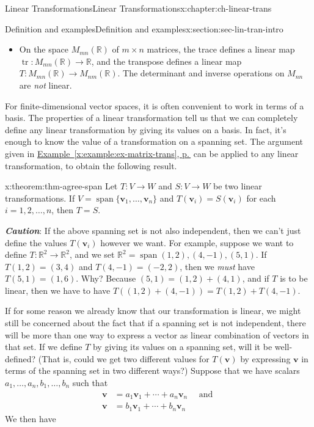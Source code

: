 \documentclass[oneside,10pt,]{book}
\newcommand{\xreffont}{\relax}
\newcommand{\alert}[1]{\textbf{\textit{#1}}}
\numberwithin{equation}{section}
\newcommand{\spn}{\operatorname{span}}
\newcommand{\R}{\mathbb{R}}
\newcommand{\vv}{\mathbf{v}}
\newcommand{\amp}{&}
\begin{document}
\begin{chapterptx}{Linear Transformations}{}{Linear Transformations}{}{}{x:chapter:ch-linear-trans}
\begin{sectionptx}{Definition and examples}{}{Definition and examples}{}{}{x:section:sec-lin-tran-intro}
\begin{itemize}[label=\textbullet]
are both linear.%
\item{}On the space \(M_{mn}(\R)\) of \(m\times n\) matrices, the trace defines a linear map \(\operatorname{tr}:M_{mn}(\R)\to \R\), and the transpose defines a linear map \(T:M_{mn}(\R)\to M_{nm}(\R)\). The determinant and inverse operations on \(M_{nn}\) are \emph{not} linear.%
\end{itemize}
%
\par
For finite-dimensional vector spaces, it is often convenient to work in terms of a basis. The properties of a linear transformation tell us that we can completely define any linear transformation by giving its values on a basis. In fact, it's enough to know the value of a transformation on a spanning set. The argument given in \hyperref[x:example:ex-matrix-trans]{Example~{\xreffont\ref{x:example:ex-matrix-trans}}, p.\,\pageref{x:example:ex-matrix-trans}} can be applied to any linear transformation, to obtain the following result.%
\begin{theorem}{}{}{x:theorem:thm-agree-span}%
Let \(T:V\to W\) and \(S:V\to W\) be two linear transformations. If \(V = \spn\{\vv_1,\ldots, \vv_n\}\) and \(T(\vv_i)=S(\vv_i)\) for each \(i=1,2,\ldots, n\), then \(T=S\).%
\end{theorem}
\alert{Caution}: If the above spanning set is not also independent, then we can't just define the values \(T(\vv_i)\) however we want. For example, suppose we want to define \(T:\R^2\to\R^2\), and we set \(\R^2=\spn{(1,2),(4,-1),(5,1)}\). If \(T(1,2)=(3,4)\) and \(T(4,-1)=(-2,2)\), then we \emph{must} have \(T(5,1)=(1,6)\). Why? Because \((5,1)=(1,2)+(4,1)\), and if \(T\) is to be linear, then we have to have \(T((1,2)+(4,-1))=T(1,2)+T(4,-1)\).%
\par
If for some reason we already know that our transformation is linear, we might still be concerned about the fact that if a spanning set is not independent, there will be more than one way to express a vector as linear combination of vectors in that set. If we define \(T\) by giving its values on a spanning set, will it be well-defined? (That is, could we get two different values for \(T(\vv)\) by expressing \(\vv\) in terms of the spanning set in two different ways?) Suppose that we have scalars \(a_1,\ldots, a_n, b_1,\ldots, b_n\) such that%
\begin{align*}
\vv \amp = a_1\vv_1+\cdots + a_n\vv_n \quad \text{ and }\\
\vv \amp = b_1\vv_1+\cdots + b_n\vv_n
\end{align*}
We then have%
\begin{align*}

\end{align*}
\end{sectionptx}
\end{chapterptx}
\end{document}
